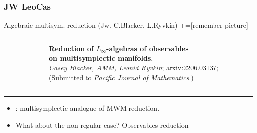 \documentclass[handout,10pt]{beamer}
\newcommand{\extrarule}{
		{
			\color{UniGreen}
			\par\hspace*{-\dimexpr0.5\paperwidth-0.5\textwidth}\rule[0.5\baselineskip]{\paperwidth}{0.4pt}
			\vspace{-2em}
		}
}
\begin{document}
\subsubsection{JW LeoCas}
	\begin{frame}[t,fragile]{Algebraic multisym. reduction (Jw. C.Blacker, L.Ryvkin)}
	+=[remember picture]
		\begin{columns}[T]
			\begin{column}{0.2\textwidth}
				\centering
			\end{column}		
			\begin{column}{0.8\textwidth}
				\centering
				\textbf{Reduction of $L_\infty$-algebras of observables\\ on multisymplectic manifolds},
				\\
				\emph{Casey Blacker, AMM, Leonid Ryvkin}; \href{https://arxiv.org/abs/2206.03137}{arxiv:2206.03137};\\
				(Submitted to \emph{Pacific Journal of Mathematics}.)	
			\end{column}		
		\end{columns}
		\extrarule
		
		\vfill
		\begin{itemize}
			\item \cite{Blacker2020}: multisymplectic analogue of MWM reduction.
			\item What about the non regular case? \quad \alert{Observables reduction}
		\end{itemize}		
		\vfill
		\pause
		

\end{frame}
\end{document}
